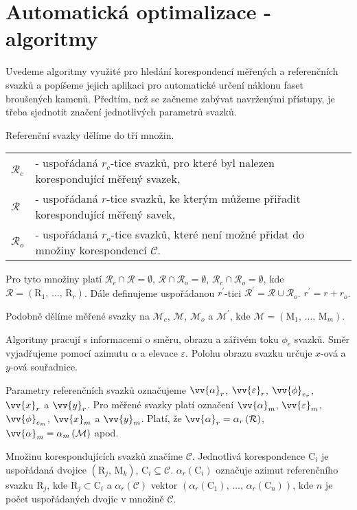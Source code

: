 \part{Automatická optimalizace - algoritmy}
	Uvedeme algoritmy využité pro hledání korespondencí měřených a referenčních svazků a popíšeme jejich aplikaci pro automatické určení náklonu faset broušených kamenů. 
	Předtím, než se začneme zabývat navrženými přístupy, je třeba sjednotit značení jednotlivých parametrů svazků. 
	
	Referenční svazky dělíme do tří množin. 
	
	\begin{tabular}{l l}
	$\mathcal{R}_c$ & - uspořádaná $r_c$-tice svazků, pro které byl nalezen korespondující měřený svazek,\\
	$\mathcal{R}$   & - uspořádaná $r$-tice svazků, ke kterým můžeme přiřadit korespondující měřený savek, \\
	$\mathcal{R}_o$ & - uspořádaná $r_o$-tice svazků, které není možné přidat do množiny korespondencí $\mathcal{C}$.  \\
	\end{tabular}	

Pro tyto množiny platí $\mathcal{R}_c \cap \mathcal{R} = \emptyset$, $\mathcal{R} \cap \mathcal{R}_o = \emptyset$, $\mathcal{R}_c \cap \mathcal{R}_o = \emptyset$, kde $\mathcal{R} = \left(\mathrm{R}_1 ,\,\dots,\, \mathrm{R}_r\right)$. Dále definujeme uspořádanou $r^\prime$-tici $\mathcal{R}^\prime = \mathcal{R} \cup \mathcal{R}_o$. $r^\prime = r +r_o $.
	
	Podobně dělíme měřené svazky na $\mathcal{M}_c$, $\mathcal{M}$, $\mathcal{M}_o$ a $ \mathcal{M}^\prime$, kde $\mathcal{M} = \left(\mathrm{M}_1 ,\,\dots,\, \mathrm{M}_m\right)$.
	 
	 Algoritmy pracují s informacemi o směru, obrazu a zářivém toku $\phi_e$ svazků. Směr vyjadřujeme pomocí azimutu $\alpha$ a elevace $\varepsilon$. Polohu obrazu svazku určuje $x$-ová a $y$-ová souřadnice.
	
	 Parametry referenčních svazků označujeme $\vv{\alpha}_{r}$, $\vv{\varepsilon}_{r}$, $\vv{\phi}_{e_{r}}$, $\vv{x}_r$  a $\vv{y}_r$. Pro měřené svazky platí označení $\vv{\alpha}_{m}$, $\vv{\varepsilon}_{m}$, $\vv{\phi}_{e_{m}}$, $\vv{x}_m$  a $\vv{y}_m$. Platí, že $\vv{\alpha}_{r} = \alpha_{r}\left(\mathcal{R}\right)$, $\vv{\alpha}_{m} = \alpha_{m}\left(\mathcal{M}\right)$ apod. 

Množinu korespondujících svazků značíme $\mathcal{C}$. Jednotlivá korespondence $\mathrm{C}_i$ je uspořádaná dvojice $\left(\mathrm{R}_j,\,\mathrm{M}_k \right)$, $\mathrm{C}_i \subseteq \mathcal{C}$. $\alpha_{r}(\mathrm{C}_i)$ označuje azimut referenčního svazku $\mathrm{R}_j$, kde $\mathrm{R}_j \subset \mathrm{C}_i$ a $\alpha_{r}(\mathcal{C})$ vektor $\left(\alpha_{r}(\mathrm{C}_1),\,\dots,\,\alpha_{r}(\mathrm{C}_n)\right)$, kde $n$ je počet uspořádaných dvojic v množině $\mathcal{C}$.
	

